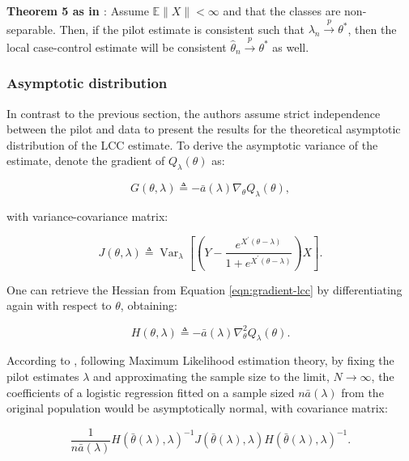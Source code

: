 \textbf{Theorem 5 as in \textcite{hastie2014}
}: Assume $\mathbb{E}\|X\|<\infty$ and that the classes are non-separable. Then, if the pilot estimate is consistent such that $\lambda_n \stackrel{p}{\rightarrow} \theta^*$, then the local case-control estimate will be consistent $\hat{\theta}_n \stackrel{p}{\rightarrow} \theta^*$ as well.

\subsubsection{Asymptotic distribution}
\label{sec:lcc-asymp}

In contrast to the previous section, the authors assume strict independence between the pilot and data to present the results for the theoretical asymptotic distribution of the LCC estimate. To derive the asymptotic variance of the estimate, denote the gradient of $Q_\lambda (\theta)$ as:

\begin{equation}
    G(\theta, \lambda) \triangleq-\bar{a}(\lambda) \nabla_\theta Q_\lambda(\theta),
    \label{eqn:gradient-lcc}
\end{equation}

with variance-covariance matrix:

\begin{equation}
    J(\theta, \lambda) \triangleq \operatorname{Var}_\lambda\left[\left(Y-\frac{e^{X^{\prime}(\theta-\lambda)}}{1+e^{X^{\prime}(\theta-\lambda)}}\right) X\right].
\end{equation}

One can retrieve the Hessian from  Equation \ref{eqn:gradient-lcc} by differentiating again with respect to $\theta$, obtaining:

\begin{equation}
    H(\theta, \lambda) \triangleq-\bar{a}(\lambda) \nabla_\theta^2 Q_\lambda(\theta).
\end{equation}

According to \textcite{hastie2014}, following Maximum Likelihood estimation theory, by fixing the pilot estimates $\lambda$ and approximating the sample size to the limit, $N \rightarrow \infty$, the coefficients of a logistic regression fitted on a sample sized $n\bar{a}(\lambda)$ from the original population would be asymptotically normal, with covariance matrix:

\begin{equation}
    \frac{1}{n\bar{a}(\lambda)} H(\bar{\theta}(\lambda), \lambda)^{-1} J(\bar{\theta}(\lambda), \lambda) H(\bar{\theta}(\lambda), \lambda)^{-1}.
\end{equation}

